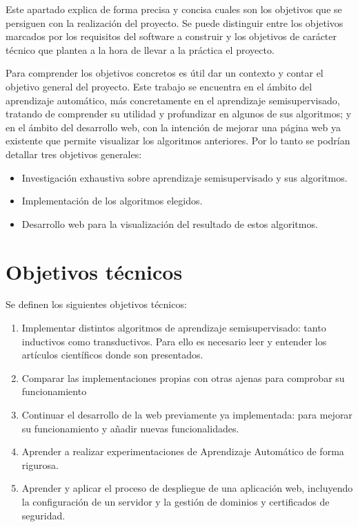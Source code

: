 
Este apartado explica de forma precisa y concisa cuales son los objetivos que se persiguen con la realización del proyecto. Se puede distinguir entre los objetivos marcados por los requisitos del software a construir y los objetivos de carácter técnico que plantea a la hora de llevar a la práctica el proyecto.

Para comprender los objetivos concretos es útil dar un contexto y contar el objetivo general del proyecto. Este trabajo se encuentra en el ámbito del aprendizaje automático, más concretamente en el aprendizaje semisupervisado, tratando de comprender su utilidad y profundizar en algunos de sus algoritmos; y en el ámbito del desarrollo web, con la intención de mejorar una página web ya existente que permite visualizar los algoritmos anteriores. Por lo tanto se podrían detallar tres objetivos generales:
\begin{itemize}
	\item Investigación exhaustiva sobre aprendizaje semisupervisado y sus algoritmos.
	\item Implementación de los algoritmos elegidos.
	\item Desarrollo web para la visualización del resultado de estos algoritmos.
\end{itemize}

\section{Objetivos técnicos}
Se definen los siguientes objetivos técnicos:

\begin{enumerate}
	\item  Implementar distintos algoritmos de aprendizaje semisupervisado: tanto inductivos como transductivos. Para ello es necesario leer y entender los artículos científicos donde son presentados.
	\item Comparar las implementaciones propias con otras ajenas para comprobar su funcionamiento
	\item Continuar el desarrollo de la web previamente ya implementada: para mejorar su funcionamiento y añadir nuevas funcionalidades.
	\item Aprender a realizar experimentaciones de Aprendizaje Automático de forma rigurosa.
	\item Aprender y aplicar el proceso de despliegue de una aplicación web, incluyendo la configuración de un servidor y la gestión de dominios y certificados de seguridad.
\end{enumerate}

